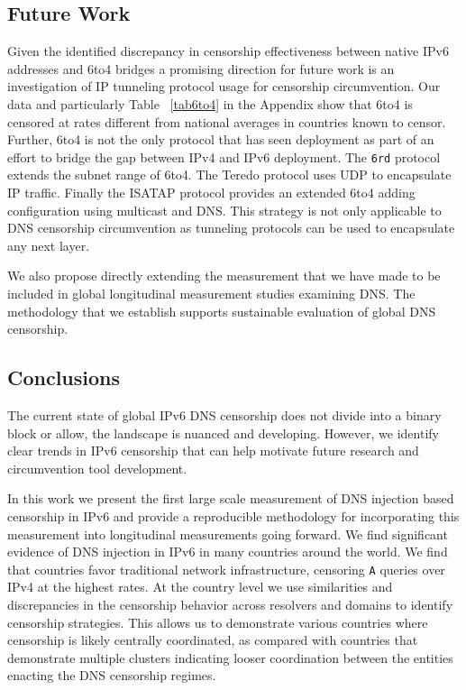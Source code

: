 \subsection{Future Work}
\label{sec:discussion:future_work}

Given the identified discrepancy in censorship effectiveness between native IPv6
addresses and 6to4 bridges a promising direction for future
work is an investigation of IP tunneling protocol usage for censorship circumvention.
Our data and particularly Table ~\ref{tab6to4} in the Appendix show that 6to4 is
censored at rates different from national averages in countries known to censor.
Further, 6to4 is not the only protocol that has seen deployment as part of an
effort to bridge the gap between IPv4 and IPv6 deployment. The \texttt{6rd} protocol
extends the subnet range of 6to4. The Teredo
protocol uses UDP to encapsulate IP traffic. Finally the ISATAP protocol provides
an extended 6to4 adding configuration using multicast and DNS.
This strategy is not only applicable to DNS censorship circumvention as tunneling
protocols can be used to encapsulate any next layer.


We also propose directly extending the measurement that we have made to be
included in global longitudinal measurement studies examining DNS. The methodology
that we establish supports sustainable evaluation of global DNS censorship.

\subsection{Conclusions}

The current state of global IPv6 DNS censorship does not divide into a binary
block or allow, the landscape is nuanced and developing. However, we identify
clear trends in IPv6 censorship that can help motivate future research and
circumvention tool development.

In this work we present the first large scale measurement of DNS injection based
censorship in IPv6 and provide a reproducible methodology for incorporating this
measurement into longitudinal measurements going forward. We find significant
evidence of DNS injection in IPv6 in many countries around the world.
We find that countries favor traditional network infrastructure, censoring
\texttt{A} queries over IPv4 at the highest rates. At the country level we
use similarities and discrepancies in the censorship behavior across resolvers
and domains to identify censorship strategies. This allows us to demonstrate
various countries where censorship is likely centrally coordinated, as compared
with countries that demonstrate multiple clusters indicating looser coordination
between the entities enacting the DNS censorship regimes.

